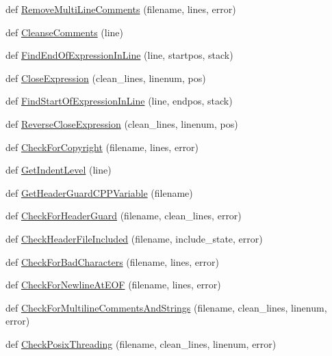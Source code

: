 \begin{DoxyCompactItemize}
\item 
def \hyperlink{namespacecpplint_ac259a6d0f292aeec05dee7ca312e1fc2}{Remove\+Multi\+Line\+Comments} (filename, lines, error)
\item 
def \hyperlink{namespacecpplint_ad795aa89f263838ec59fb0e7c52c842a}{Cleanse\+Comments} (line)
\item 
def \hyperlink{namespacecpplint_a6e623c46c1ae3bf650454744a693a633}{Find\+End\+Of\+Expression\+In\+Line} (line, startpos, stack)
\item 
def \hyperlink{namespacecpplint_af254258f584f59c87fcfd755e3c9017a}{Close\+Expression} (clean\+\_\+lines, linenum, pos)
\item 
def \hyperlink{namespacecpplint_a8572f47efb3bc11632d1192fd74bb7eb}{Find\+Start\+Of\+Expression\+In\+Line} (line, endpos, stack)
\item 
def \hyperlink{namespacecpplint_a15cd96cbf1c13e655e156fbd98cf0bae}{Reverse\+Close\+Expression} (clean\+\_\+lines, linenum, pos)
\item 
def \hyperlink{namespacecpplint_a0ad6bf921300c829db3696b81fa52d20}{Check\+For\+Copyright} (filename, lines, error)
\item 
def \hyperlink{namespacecpplint_a1b5cb7c1367845d7c7079eac5ea61dc8}{Get\+Indent\+Level} (line)
\item 
def \hyperlink{namespacecpplint_a3f143d4e8f70c0fd05e3f0ce81b0cc9a}{Get\+Header\+Guard\+C\+P\+P\+Variable} (filename)
\item 
def \hyperlink{namespacecpplint_a3694fa1b195f49a0d78dfc81ee665eec}{Check\+For\+Header\+Guard} (filename, clean\+\_\+lines, error)
\item 
def \hyperlink{namespacecpplint_ab549dcced7ca1d4b24538ec52b42439e}{Check\+Header\+File\+Included} (filename, include\+\_\+state, error)
\item 
def \hyperlink{namespacecpplint_a03c0e0d285b02b0e26ec514761654da8}{Check\+For\+Bad\+Characters} (filename, lines, error)
\item 
def \hyperlink{namespacecpplint_a7a594af230939932174dd5743088027d}{Check\+For\+Newline\+At\+E\+OF} (filename, lines, error)
\item 
def \hyperlink{namespacecpplint_a81c4baf76bde576f56661c22d01e470d}{Check\+For\+Multiline\+Comments\+And\+Strings} (filename, clean\+\_\+lines, linenum, error)
\item 
def \hyperlink{namespacecpplint_a9c406c00843a2c47058b1e9dec4e5b11}{Check\+Posix\+Threading} (filename, clean\+\_\+lines, linenum, error)
\item 

\end{DoxyCompactItemize}
